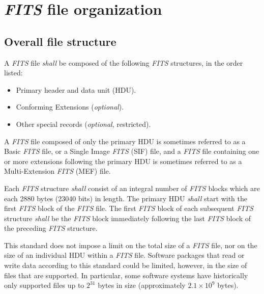 \documentclass[onecolumn]{aa}
\begin{document}
\section{{\em FITS\/} file organization}
  \label{s:org}


  \subsection{Overall file structure}

   A {\em FITS\/} file {\em shall} be composed of the following {\em FITS\/} 
   structures, in the 
   order
   listed:
   \begin{itemize}
   \item Primary header and data unit (HDU).
   \item Conforming Extensions
   ({\em optional}).
   \item Other special records ({\em optional}, restricted).
   \end{itemize}
\noindent
   A {\em FITS\/} file composed of only the primary HDU is sometimes referred to
   as a Basic {\em FITS\/} file, or a Single Image {\em FITS\/} (SIF) file, and a
   {\em FITS\/} file  containing one or more extensions following the primary HDU
   is sometimes referred to as a Multi-Extension {\em FITS\/} (MEF) file. 
   
   Each {\em FITS\/} structure {\em shall}  consist of an
   integral number of {\em FITS\/} blocks which are each 2880 bytes (23040 bits)
   in length. The primary HDU {\em shall} start  with the
   first {\em FITS\/} block of the {\em FITS\/} file.  The first {\em FITS\/}
   block of each subsequent  {\em FITS\/} structure {\em
   shall} be  the {\em FITS\/} block immediately  following the last {\em FITS\/}
   block of the preceding {\em FITS\/} structure.  

This standard does not impose a limit on the total size of 
a {\em FITS\/} file, nor on the size of an individual HDU within 
a {\em FITS\/} file. Software packages that read or write data 
according to this standard could be limited, however, in the size of
files that are supported. In particular, some software systems have 
historically only supported files up to $2^{31}$ bytes in size 
(approximately $2.1\times10^9$ bytes). 
\end{document}
